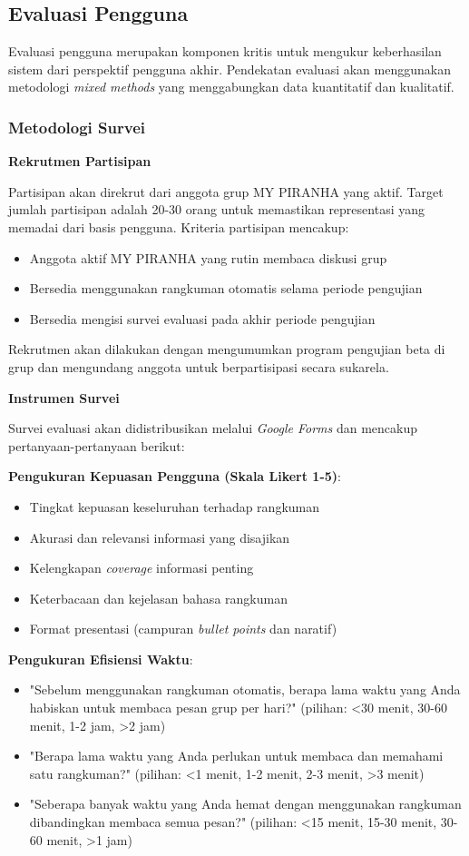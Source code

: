 \subsection{Evaluasi Pengguna}

Evaluasi pengguna merupakan komponen kritis untuk mengukur keberhasilan sistem dari perspektif pengguna akhir. Pendekatan evaluasi akan menggunakan metodologi \textit{mixed methods} yang menggabungkan data kuantitatif dan kualitatif.

\subsubsection{Metodologi Survei}

\textbf{Rekrutmen Partisipan}

Partisipan akan direkrut dari anggota grup MY PIRANHA yang aktif. Target jumlah partisipan adalah 20-30 orang untuk memastikan representasi yang memadai dari basis pengguna. Kriteria partisipan mencakup:
\begin{itemize}
\item Anggota aktif MY PIRANHA yang rutin membaca diskusi grup
\item Bersedia menggunakan rangkuman otomatis selama periode pengujian
\item Bersedia mengisi survei evaluasi pada akhir periode pengujian
\end{itemize}

Rekrutmen akan dilakukan dengan mengumumkan program pengujian beta di grup dan mengundang anggota untuk berpartisipasi secara sukarela.

\textbf{Instrumen Survei}

Survei evaluasi akan didistribusikan melalui \textit{Google Forms} dan mencakup pertanyaan-pertanyaan berikut:

\textbf{Pengukuran Kepuasan Pengguna (Skala Likert 1-5)}:
\begin{itemize}
\item Tingkat kepuasan keseluruhan terhadap rangkuman
\item Akurasi dan relevansi informasi yang disajikan
\item Kelengkapan \textit{coverage} informasi penting
\item Keterbacaan dan kejelasan bahasa rangkuman
\item Format presentasi (campuran \textit{bullet points} dan naratif)
\end{itemize}

\textbf{Pengukuran Efisiensi Waktu}:
\begin{itemize}
\item "Sebelum menggunakan rangkuman otomatis, berapa lama waktu yang Anda habiskan untuk membaca pesan grup per hari?" (pilihan: <30 menit, 30-60 menit, 1-2 jam, >2 jam)
\item "Berapa lama waktu yang Anda perlukan untuk membaca dan memahami satu rangkuman?" (pilihan: <1 menit, 1-2 menit, 2-3 menit, >3 menit)
\item "Seberapa banyak waktu yang Anda hemat dengan menggunakan rangkuman dibandingkan membaca semua pesan?" (pilihan: <15 menit, 15-30 menit, 30-60 menit, >1 jam)
\end{itemize}

